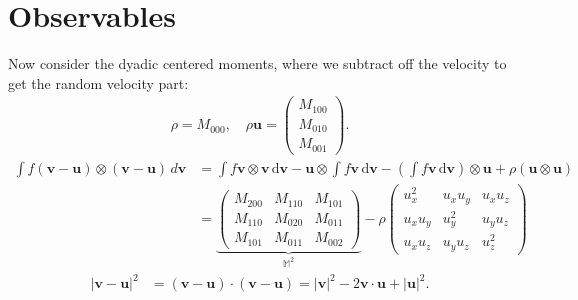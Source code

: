 \documentclass{article}
\begin{document}
\section{Observables}
Now consider the dyadic centered moments, where we subtract off the velocity to get the random velocity part:
\begin{align*}
    \rho = M_{000}, \quad 
    \rho \bm{u} = \begin{pmatrix}
        M_{100} \\ M_{010} \\ M_{001}
    \end{pmatrix}.
\end{align*}
\begin{align*}
    \int f (\bm{v} - \bm{u}) \otimes (\bm{v} - \bm{u})\,d \bm{v} &= \int f \bm{v} \otimes \bm{v} \, \mathrm{d} \bm{v} - \bm{u} \otimes \int f \bm{v} \,\mathrm{d} \bm{v} - \left( \int f \bm{v} \, \mathrm{d} \bm{v} \right) \otimes \bm{u} + \rho(\bm{u} \otimes \bm{u}) \\
                                                                 &= \underbrace{\begin{pmatrix}
                                                                     M_{200} & M_{110} & M_{101} \\
                                                                     M_{110} & M_{020} & M_{011} \\
                                                                     M_{101} & M_{011} & M_{002}
                                                             \end{pmatrix}}_{\mathbb{M}^2} - 
                                                                 \rho
                                                                 \begin{pmatrix}
                                                                     u_x^2 & u_x u_y & u_x u_z \\
                                                                     u_x u_y & u_y^2 & u_y u_z \\
                                                                     u_x u_z & u_y u_z & u_z^2
                                                                 \end{pmatrix}
\end{align*}
\begin{align*}
    |\bm{v} - \bm{u}|^2 &= (\bm{v} - \bm{u}) \cdot (\bm{v} - \bm{u}) = |\bm{v}|^2 - 2\bm{v} \cdot \bm{u} + |\bm{u}|^2.
\end{align*}
\end{document}
